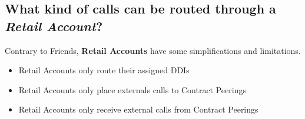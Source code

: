 \documentclass[letterpaper,10pt,english]{sphinxmanual}
\begin{document}
\subsection{What kind of calls can be routed through a \emph{Retail Account}?}
\label{retail/retail_accounts:what-kind-of-calls-can-be-routed-through-a-retail-account}
Contrary to Friends, \textbf{Retail Accounts} have some simplifications and limitations.
\begin{itemize}
\item {} 
Retail Accounts only route their assigned DDIs

\item {} 
Retail Accounts only place externals calls to Contract Peerings

\item {} 
Retail Accounts only receive external calls from Contract Peerings

\end{itemize}
\end{document}
